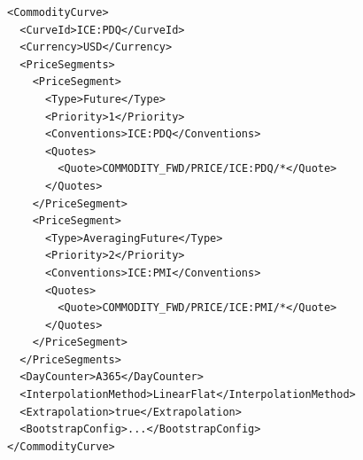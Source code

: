 \begin{longlisting}
\begin{verbatim}
<CommodityCurve>
  <CurveId>ICE:PDQ</CurveId>
  <Currency>USD</Currency>
  <PriceSegments>
    <PriceSegment>
      <Type>Future</Type>
      <Priority>1</Priority>
      <Conventions>ICE:PDQ</Conventions>
      <Quotes>
        <Quote>COMMODITY_FWD/PRICE/ICE:PDQ/*</Quote>
      </Quotes>
    </PriceSegment>
    <PriceSegment>
      <Type>AveragingFuture</Type>
      <Priority>2</Priority>
      <Conventions>ICE:PMI</Conventions>
      <Quotes>
        <Quote>COMMODITY_FWD/PRICE/ICE:PMI/*</Quote>
      </Quotes>
    </PriceSegment>
  </PriceSegments>
  <DayCounter>A365</DayCounter>
  <InterpolationMethod>LinearFlat</InterpolationMethod>
  <Extrapolation>true</Extrapolation>
  <BootstrapConfig>...</BootstrapConfig>
</CommodityCurve>
\end{verbatim}
\caption{Commodity curve configuration for PJM Real Time Peak}
\label{lst:commodity_crv_config_ice_pdq}
\end{longlisting}

